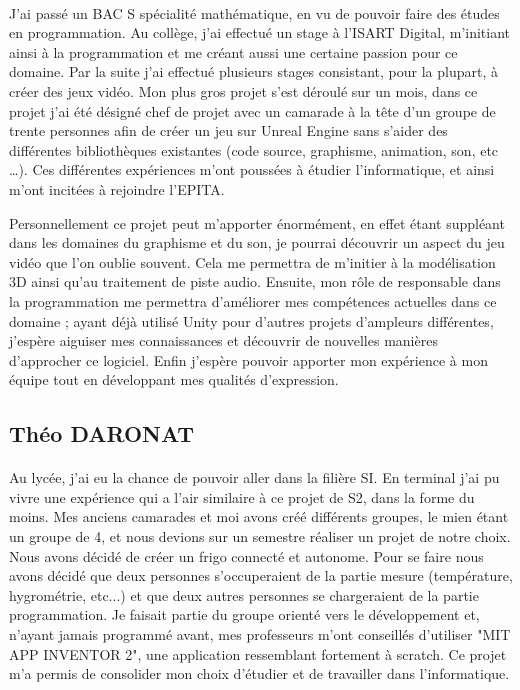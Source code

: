 \documentclass[12pt]{report}
\begin{document}
		\paragraph{}
			J'ai passé un BAC S spécialité mathématique, en vu de pouvoir faire des études en programmation. Au collège, j'ai effectué un stage à l'ISART Digital, m'initiant ainsi à la programmation et me créant aussi une certaine passion pour ce domaine. Par la suite j'ai effectué plusieurs stages consistant, pour la plupart, à créer des jeux vidéo. Mon plus gros projet s'est déroulé sur un mois, dans ce projet j'ai été désigné chef de projet avec un camarade à la tête d'un groupe de trente personnes afin de créer un jeu sur Unreal Engine sans s'aider des différentes bibliothèques existantes (code source, graphisme, animation, son, etc …). Ces différentes expériences m'ont poussées à étudier l'informatique, et ainsi m'ont incitées à rejoindre l'EPITA.
			
Personnellement ce projet peut m'apporter énormément, en effet étant suppléant dans les domaines du graphisme et du son, je pourrai découvrir un aspect du jeu vidéo que l'on oublie souvent. Cela me permettra de m'initier à la modélisation 3D ainsi qu'au traitement de piste audio. Ensuite, mon rôle de responsable dans la programmation me permettra d'améliorer mes compétences actuelles dans ce domaine ; ayant déjà utilisé Unity pour d'autres projets d'ampleurs différentes, j'espère aiguiser mes connaissances et découvrir de nouvelles manières d'approcher ce logiciel. Enfin j'espère pouvoir apporter  mon expérience à mon équipe tout en développant mes qualités d'expression.

		\subsection{Théo DARONAT}
		\paragraph{}
		
			Au lycée, j'ai eu la chance de pouvoir aller dans la filière SI. En terminal j'ai pu vivre une expérience qui a l'air similaire à ce projet de S2, dans la forme du moins. Mes anciens camarades et moi avons créé différents groupes, le mien étant un groupe de 4, et nous devions sur un semestre réaliser un projet de notre choix. Nous avons décidé de créer un frigo connecté et autonome. Pour se faire nous avons décidé que deux personnes s'occuperaient de la partie mesure (température, hygrométrie, etc...) et que deux autres personnes se chargeraient de la partie programmation. Je faisait partie du groupe orienté vers le développement et, n'ayant jamais programmé avant, mes professeurs m'ont conseillés d'utiliser "MIT APP INVENTOR 2", une application ressemblant fortement à scratch. Ce projet m'a permis de consolider mon choix d'étudier et de travailler dans l'informatique.\\
			
\end{document}
